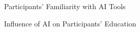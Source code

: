 \documentclass[12pt]{article}
\begin{document}
\begin{figure}[bht]
	\begin{center}
	{}
	\end{center} 
	\vspace{-5mm} %
\caption{Participants' Familiarity with AI Tools}
	\label{familiarity}
	\end{figure}

\begin{figure}[bht]
	\begin{center}
	{}
	\end{center}
	\vspace{-5mm} %
\caption{Influence of AI on Participants' Education}
	\label{educaiton}
	\end{figure}
\end{document}
